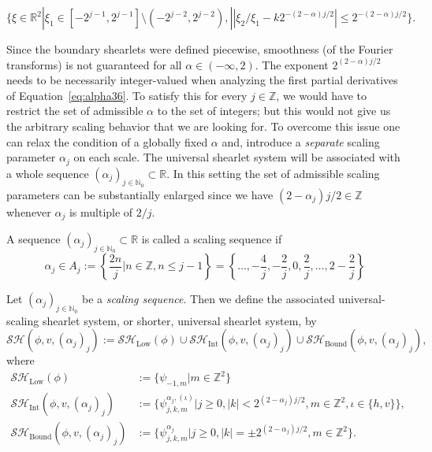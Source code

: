 \begin{defn}
\begin{enumerate}
\begin{equation}
\label{eq:alpha37}
\{\xi\in\mathbb{R}^2|\xi_1\in[-2^{j-1},2^{j-1}]\setminus (-2^{j-2},2^{j-2}),||\xi_2/\xi_1-k2^{-(2-\alpha)j/2}|\leq 2^{-(2-\alpha)j/2}\}.
\end{equation}
\end{enumerate}
\end{defn}

\bigskip

Since the boundary shearlets were defined piecewise, smoothness (of the Fourier transforms) is not guaranteed for all $\alpha\in (-\infty,2)$. The exponent $2^{(2-\alpha)j/2}$ needs to be necessarily integer-valued when analyzing the first partial derivatives of Equation~\ref{eq:alpha36}. To satisfy this for every $j\in\mathbb{Z}$, we would have to restrict the set of admissible $\alpha$ to the set of integers; but this would not give us the arbitrary scaling behavior that we are looking for. To overcome this issue one can relax the condition of a globally fixed $\alpha$ and, introduce a \textit{separate} scaling parameter $\alpha_j$ on each scale. The universal shearlet system will be associated with a whole sequence $(\alpha_j)_{j\in\mathbb{N}_0}\subset\mathbb{R}$. In this setting the set of admissible scaling parameters can be substantially enlarged since we have $(2-\alpha_j)j/2\in\mathbb{Z}$ whenever $\alpha_j$ is multiple of $2/j$. 

\bigskip

\begin{defn}
\label{def:alpha32}
A sequence $(\alpha_j)_{j\in\mathbb{N}_0}\subset\mathbb{R}$ is called a scaling sequence if 
$$
\alpha_j\in A_j:=\left \{\frac{2n}{j}\big| n\in\mathbb{Z},n\leq j-1\right \}=\left \{\ldots,-\frac{4}{j},-\frac{2}{j},0,\frac{2}{j},\ldots,2-\frac{2}{j}\right \}
$$
\end{defn}

\bigskip

\begin{defn}
\label{def:alpha33}
Let $(\alpha_j)_{j\in\mathbb{N}_0}$ be a \textit{scaling sequence}. Then we define the associated universal-scaling shearlet system, or shorter, universal shearlet system, by
$$
\mathcal{SH}(\phi,v,(\alpha_j)_j):=\mathcal{SH}_{\text{Low}}(\phi)\cup\mathcal{SH}_{\text{Int}}(\phi,v,(\alpha_j)_j)\cup\mathcal{SH}_{\text{Bound}}(\phi,v,(\alpha_j)_j),
$$
where
$$
\begin{aligned}
\mathcal{SH}_{\text{Low}}(\phi)&:=\{\psi_{-1,m}|m\in\mathbb{Z}^2\}\\
\mathcal{SH}_{\text{Int}}(\phi,v,(\alpha_j)_j)&:=\{\psi_{j,k,m}^{\alpha_j,(\iota)}|j\geq 0,|k|< 2^{(2-\alpha_j)j/2},m\in\mathbb{Z}^2,\iota\in\{h,v\}\},\\
\mathcal{SH}_{\text{Bound}}(\phi,v,(\alpha_j)_j)&:=\{\psi_{j,k,m}^{\alpha_j}|j\geq 0,|k|=\pm 2^{(2-\alpha_j)j/2},m\in\mathbb{Z}^2\}.
\end{aligned}
$$

\end{defn}

